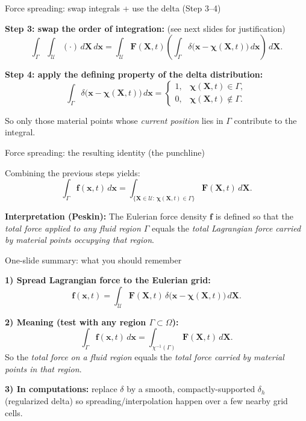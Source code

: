 \documentclass{beamer}
\begin{document}
\begin{frame}{Force spreading: swap integrals + use the delta (Step 3--4)}
\footnotesize

\textbf{Step 3: swap the order of integration:} (see next slides for justification)
\[
\int_{\Gamma}\int_{\mathcal{U}}(\cdot)\,d\mathbf{X}\,d\mathbf{x}
=
\int_{\mathcal{U}}
\mathbf{F}(\mathbf{X},t)\left(
\int_{\Gamma}\delta\!\big(\mathbf{x}-\boldsymbol{\chi}(\mathbf{X},t)\big)\,d\mathbf{x}
\right)\,d\mathbf{X}.
\]

\medskip
\textbf{Step 4: apply the defining property of the delta distribution:}
\[
\int_{\Gamma}\delta\!\big(\mathbf{x}-\boldsymbol{\chi}(\mathbf{X},t)\big)\,d\mathbf{x}
=
\begin{cases}
1, & \boldsymbol{\chi}(\mathbf{X},t)\in \Gamma,\\
0, & \boldsymbol{\chi}(\mathbf{X},t)\notin \Gamma.
\end{cases}
\]

\medskip
So only those material points whose \emph{current position} lies in $\Gamma$ contribute to the integral.
\end{frame}

\begin{frame}{Force spreading: the resulting identity (the punchline)}
\footnotesize

Combining the previous steps yields:
\[
\boxed{
\int_{\Gamma}\mathbf{f}(\mathbf{x},t)\,d\mathbf{x}
=
\int_{\{\mathbf{X}\in\mathcal{U}:\,\boldsymbol{\chi}(\mathbf{X},t)\in\Gamma\}}
\mathbf{F}(\mathbf{X},t)\,d\mathbf{X}.
}
\]

\medskip
\textbf{Interpretation (Peskin):}
The Eulerian force density $\mathbf{f}$ is defined so that the \emph{total force applied to any fluid region $\Gamma$}
equals the \emph{total Lagrangian force carried by material points occupying that region}.
\end{frame}



\begin{frame}{One-slide summary: what you should remember}
\footnotesize

\textbf{1) Spread Lagrangian force to the Eulerian grid:}
\[
\boxed{
\mathbf{f}(\mathbf{x},t)=\int_{\mathcal{U}}\mathbf{F}(\mathbf{X},t)\,
\delta\!\big(\mathbf{x}-\boldsymbol{\chi}(\mathbf{X},t)\big)\,d\mathbf{X}.
}
\]

\medskip
\textbf{2) Meaning (test with any region $\Gamma\subset\Omega$):}
\[
\boxed{
\int_{\Gamma}\mathbf{f}(\mathbf{x},t)\,d\mathbf{x}
=
\int_{\chi^{-1}(\Gamma)}\mathbf{F}(\mathbf{X},t)\,d\mathbf{X}.
}
\]
So the \emph{total force on a fluid region} equals the \emph{total force carried by material points in that region}.

\medskip
\textbf{3) In computations:}
replace $\delta$ by a smooth, compactly-supported $\delta_h$ (regularized delta) so spreading/interpolation
happen over a few nearby grid cells.
\end{frame}
\end{document}
